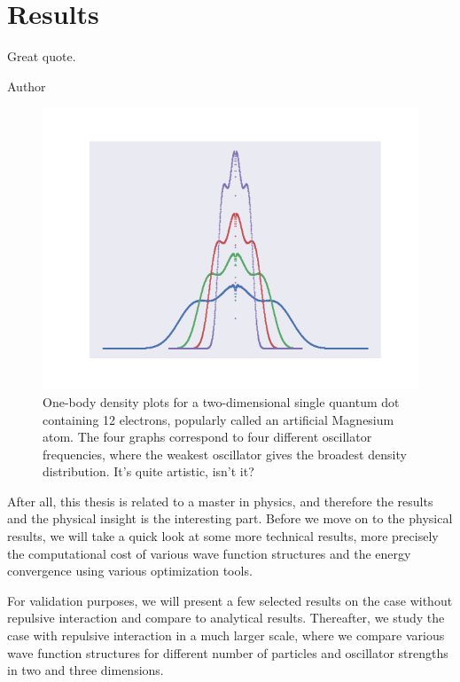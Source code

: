 \chapter{Results} \label{sec:results}
\epigraph{Great quote.}{Author}
\begin{figure}[H]
	\centering
	\includegraphics[scale=0.7]{Images/art.png}
	\caption{One-body density plots for a two-dimensional single quantum dot containing 12 electrons, popularly called an artificial Magnesium atom. The four graphs correspond to four different oscillator frequencies, where the weakest oscillator gives the broadest density distribution. It's quite artistic, isn't it?}
\end{figure}
After all, this thesis is related to a master in physics, and therefore the results and the physical insight is the interesting part. Before we move on to the physical results, we will take a quick look at some more technical results, more precisely the computational cost of various wave function structures and the energy convergence using various optimization tools. 

For validation purposes, we will present a few selected results on the case without repulsive interaction and compare to analytical results. Thereafter, we study the case with repulsive interaction in a much larger scale, where we compare various wave function structures for different number of particles and oscillator strengths in two and three dimensions.

\newpage
